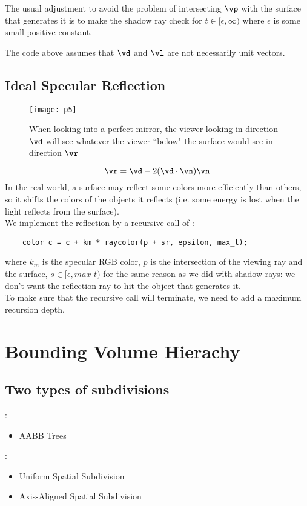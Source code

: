 \documentclass[11pt]{article}
\numberwithin{equation}{section}
\begin{document}
\remark
The usual adjustment to avoid the problem of intersecting $\vp$ with the surface that generates it is to make the shadow ray check for $t \in [\epsilon, \infty)$ where $\epsilon$ is some small positive constant.

\remark
The code above assumes that $\vd$ and $\vl$ are not necessarily unit vectors. 

\subsection{Ideal Specular Reflection}
\begin{figure}[H]
	\centering
	\texttt{[image: p5]}
	\caption{When looking into a perfect mirror, the viewer looking in direction $\vd$ will see whatever the viewer ``below" the surface would see in direction $\vr$}
\end{figure}
$$\vr = \vd - 2(\vd \cdot \vn)\vn$$
In the real world, a surface may reflect some colors more efficiently than others, so it shifts the colors of the objects it reflects (i.e. some energy is lost when the light reflects from the surface). \\
We implement the reflection by a recursive call of :
\begin{framed}
\begin{verbatim}
	color c = c + km * raycolor(p + sr, epsilon, max_t);
\end{verbatim}
\end{framed}
\noindent where $k_m$ is the specular RGB color, $p$ is the intersection of the viewing ray and the surface, $s \in [\epsilon, max\_t)$ for the same reason as we did with shadow rays: we don't want the reflection ray to hit the object that generates it.\\
To make sure that the recursive call will terminate, we need to add a maximum recursion depth.


\section{Bounding Volume Hierachy}
\subsection{Two types of subdivisions}
:
\begin{itemize}
	\item AABB Trees
\end{itemize}
:
\begin{itemize}
	\item Uniform Spatial Subdivision
	\item Axis-Aligned Spatial Subdivision
\end{itemize}
\end{document}
